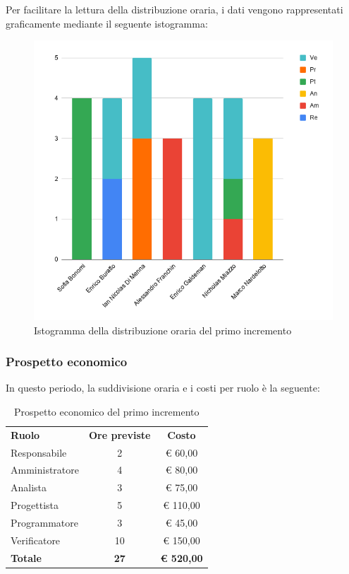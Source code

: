 \documentclass[../piano-di-progetto.tex]{subfiles}
\begin{document}
  Per facilitare la lettura della distribuzione oraria, i dati vengono rappresentati graficamente mediante il seguente istogramma:
  \begin{figure}[H]
    \centering
    \includegraphics[width=12cm]{img/ore-1-incr.png}
    \caption{Istogramma della distribuzione oraria del primo incremento}
    \label{fig:ore-componente-progettazione}
  \end{figure}

  \subsubsection{Prospetto economico}
  In questo periodo, la suddivisione oraria e i costi per ruolo è la seguente:

  \begin{table}[H]
    \centering
    \begin{tabular}{lcc}
      \rowcolor{lightgray}
      \textbf{Ruolo}  & \textbf{Ore previste} & \textbf{Costo}    \\
Responsabile    & 2                     & € 60,00           \\
Amministratore  & 4                     & € 80,00           \\
Analista        & 3                     & € 75,00           \\
Progettista     & 5                     & € 110,00          \\
Programmatore   & 3                     & € 45,00           \\
Verificatore    & 10                    & € 150,00          \\
\textbf{Totale} & \textbf{27}           & \textbf{€ 520,00}
    \end{tabular}
    \caption{Prospetto economico del primo incremento}
  \end{table}
\end{document}
